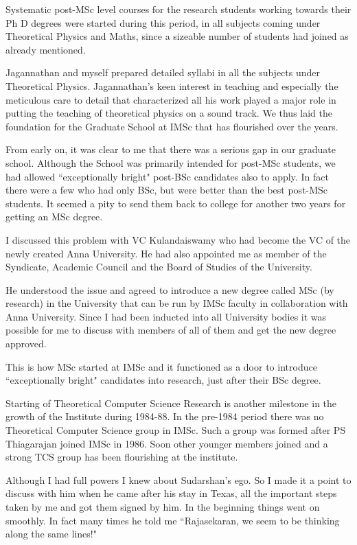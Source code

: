 Systematic post-MSc level courses for the research students working 
towards their Ph D degrees were started during this period, in all 
subjects coming under Theoretical Physics and Maths, since a sizeable 
number of students had joined as already mentioned.

Jagannathan and myself prepared detailed syllabi in all the subjects 
under Theoretical Physics. Jagannathan's keen interest in teaching and 
especially the meticulous care to detail that characterized all his work 
played a major role in putting the teaching of theoretical physics on a 
sound track. We thus laid the foundation for the Graduate School at IMSc 
that has flourished over the years.

From early on, it was clear to me that there was a serious gap in our 
graduate school. Although the School was primarily intended for post-MSc 
students, we had allowed ``exceptionally bright" post-BSc candidates also 
to apply. In fact there were a few who had only BSc, but were better than 
the best post-MSc students. It seemed a pity to send them back to 
college for another two years for getting an MSc degree.

I discussed this problem with VC Kulandaiswamy who had become the VC of 
the newly created Anna University. He had also appointed me as member of 
the Syndicate, Academic Council and the Board of Studies of the 
University.

He understood the issue and agreed to introduce a new degree called MSc 
(by research) in the University that can be run by IMSc faculty in 
collaboration with Anna University. Since I had been inducted into all 
University bodies it was possible for me to discuss with members of all 
of them and get the new degree approved.

This is how MSc started at IMSc and it functioned as a door to introduce 
``exceptionally bright" candidates into research, just after their BSc 
degree.

Starting of Theoretical Computer Science Research is another milestone 
in the growth of the Institute during 1984-88. In the pre-1984 period 
there was no Theoretical Computer Science group in IMSc. Such a group 
was formed after PS Thiagarajan joined IMSc in 1986. Soon other younger 
members joined and a strong TCS group has been flourishing at the 
institute.

Although I had full powers I knew about Sudarshan's ego. So I made it a 
point to discuss with him when he came after his stay in Texas, all the 
important steps taken by me and got them signed by him. In the beginning 
things went on smoothly. In fact many times he told me ``Rajasekaran, we 
seem to be thinking along the same lines!"
 
